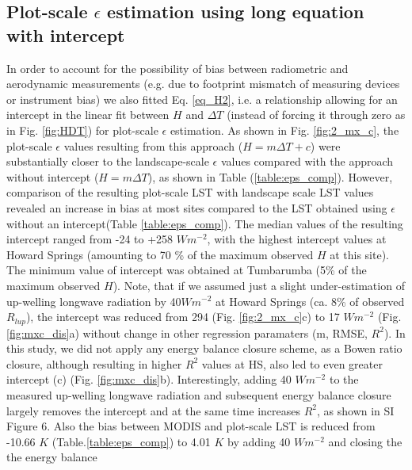 \documentclass[fleqn,10pt]{wlscirep}
\begin{document}
\subsection{Plot-scale $\epsilon$ estimation using long equation with intercept}
In order to account for the possibility of bias between radiometric and aerodynamic measurements (e.g. due to footprint mismatch of measuring devices or instrument bias) we also fitted Eq. \ref{eq_H2}, i.e. a relationship allowing for an intercept in the linear fit between $H$ and $\Delta T$ (instead of forcing it through zero as in Fig. \ref{fig:HDT}) for plot-scale $\epsilon$ estimation. As shown in Fig. \ref{fig:2_mx_c}, the plot-scale $\epsilon$ values resulting from this approach ($H=m \Delta T + c$) were substantially closer to the landscape-scale $\epsilon$ values compared with the approach without intercept ($H=m \Delta T$), as shown in Table (\ref{table:eps_comp}). However, comparison of the resulting plot-scale LST with landscape scale LST values revealed an increase in bias at most sites compared to the LST obtained using $\epsilon$ without an intercept(Table \ref{table:eps_comp}). The median values of the resulting intercept ranged from -24 to +258 $Wm^{-2}$, with the highest intercept values at Howard Springs (amounting to 70 \% of the maximum observed $H$ at this site). The minimum value of intercept was obtained at Tumbarumba (5\% of the maximum observed $H$). Note, that if we assumed just a slight under-estimation of up-welling longwave radiation by 40$Wm^{-2}$ at Howard Springs (ca. 8\% of observed $R_{lup}$), the intercept was reduced from 294 (Fig. \ref{fig:2_mx_c}c) to 17  $Wm^{-2}$ (Fig. \ref{fig:mxc_dis}a) without change in other regression paramaters (m, RMSE, $R^{2}$). In this study, we did not apply any energy balance closure scheme, as a Bowen ratio closure, although resulting in higher $R^{2}$ values at HS, also led to even greater intercept (c) (Fig. \ref{fig:mxc_dis}b). 
Interestingly, adding 40 $Wm^{-2}$ to the  measured up-welling longwave radiation and subsequent energy balance closure largely removes the intercept and at the same time increases $R^2$, as shown in SI Figure 6. Also the bias between MODIS and plot-scale LST is reduced from -10.66 $K$ (Table.\ref{table:eps_comp}) to 4.01 $K$ by adding 40 $Wm^{-2}$ and closing the the energy balance 
\end{document}
